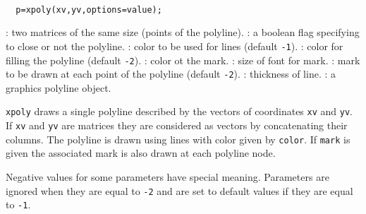 \begin{mandesc}
  \\
\end{mandesc}
\begin{calling_sequence}
\begin{verbatim}
  p=xpoly(xv,yv,options=value);
\end{verbatim}
\end{calling_sequence}
\begin{parameters}
  \begin{varlist}
    : two matrices of the same size (points of the polyline).
    : a boolean flag specifying to close or not the polyline.
    : color to be used for lines (default \verb!-1!).
    : color for filling the polyline (default \verb!-2!).
    : color ot the mark.
    : size of font for mark.
    : mark to be drawn at each point of the polyline (default \verb!-2!).
    : thickness of line.
    : a graphics polyline object.
  \end{varlist}
\end{parameters}
\begin{mandescription}
  \verb!xpoly! draws a single polyline described by the vectors of
  coordinates \verb!xv! and \verb!yv!. If \verb!xv! and
  \verb!yv! are matrices they are considered as vectors by
  concatenating their columns. The polyline is drawn using
  lines with color given by \verb!color!. If \verb!mark! is
  given the associated mark is also drawn at each polyline node.

  Negative values for some parameters have special meaning.
  Parameters are ignored when they are equal to \verb!-2!
  and are set to default values if they are equal to \verb!-1!.
\end{mandescription}
